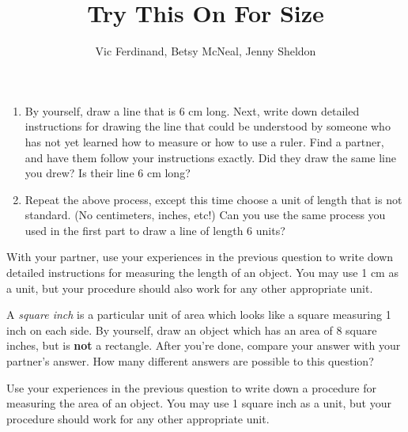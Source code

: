 \documentclass[handout]{ximera}
\title{Try This On For Size}
\author{Vic Ferdinand, Betsy McNeal, Jenny Sheldon}
\begin{document}
\begin{abstract}
\end{abstract}
\maketitle




\begin{problem} \label{Size1}
\hfill
\begin{enumerate}
\item By yourself, draw a line that is 6 cm long.  Next, write down detailed instructions for drawing the line that could be understood by someone who has not yet learned how to measure or how to use a ruler.  Find a partner, and have them follow your instructions exactly.  Did they draw the same line you drew?  Is their line 6 cm long?  
\item Repeat the above process, except this time choose a unit of length that is not standard.  (No centimeters, inches, etc!)  Can you use the same process you used in the first part to draw a line of length 6 units?
\end{enumerate}

\end{problem}



\begin{problem}
With your partner, use your experiences in the previous question to write down detailed instructions for measuring the length of an object.  You may use 1 cm as a unit, but your procedure should also work for any other appropriate unit.
\end{problem}





\begin{problem} \label{Size3}
A {\it square inch} is a particular unit of area which looks like a square measuring 1 inch on each side.  By yourself, draw an object which has an area of 8 square inches, but is {\bf not} a rectangle.  After you're done, compare your answer with your partner's answer.  How many different answers are possible to this question?
\end{problem}





\begin{problem}
Use your experiences in the previous question to write down a procedure for measuring the area of an object.  You may use 1 square inch as a unit, but your procedure should work for any other appropriate unit.  
\end{problem}
\end{document}
